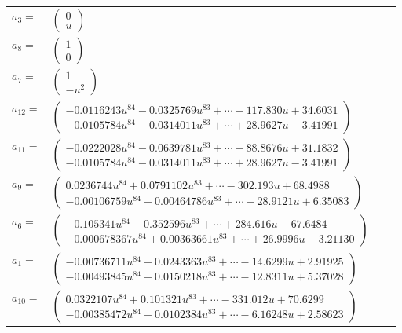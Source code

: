 \documentclass[1p]{elsarticle_modified}
\theoremstyle{definition}
\begin{document}
\begin{tabular}{m{7pt} m{180pt} m{7pt} m{180pt} }
\flushright $a_{3}=$&$\begin{pmatrix}0\\u\end{pmatrix}$ \\
\flushright $a_{8}=$&$\begin{pmatrix}1\\0\end{pmatrix}$ \\
\flushright $a_{7}=$&$\begin{pmatrix}1\\- u^2\end{pmatrix}$ \\
\flushright $a_{12}=$&$\begin{pmatrix}-0.0116243 u^{84}-0.0325769 u^{83}+\cdots-117.830 u+34.6031\\-0.0105784 u^{84}-0.0314011 u^{83}+\cdots+28.9627 u-3.41991\end{pmatrix}$ \\
\flushright $a_{11}=$&$\begin{pmatrix}-0.0222028 u^{84}-0.0639781 u^{83}+\cdots-88.8676 u+31.1832\\-0.0105784 u^{84}-0.0314011 u^{83}+\cdots+28.9627 u-3.41991\end{pmatrix}$ \\
\flushright $a_{9}=$&$\begin{pmatrix}0.0236744 u^{84}+0.0791102 u^{83}+\cdots-302.193 u+68.4988\\-0.00106759 u^{84}-0.00464786 u^{83}+\cdots-28.9121 u+6.35083\end{pmatrix}$ \\
\flushright $a_{6}=$&$\begin{pmatrix}-0.105341 u^{84}-0.352596 u^{83}+\cdots+284.616 u-67.6484\\-0.000678367 u^{84}+0.00363661 u^{83}+\cdots+26.9996 u-3.21130\end{pmatrix}$ \\
\flushright $a_{1}=$&$\begin{pmatrix}-0.00736711 u^{84}-0.0243363 u^{83}+\cdots-14.6299 u+2.91925\\-0.00493845 u^{84}-0.0150218 u^{83}+\cdots-12.8311 u+5.37028\end{pmatrix}$ \\
\flushright $a_{10}=$&$\begin{pmatrix}0.0322107 u^{84}+0.101321 u^{83}+\cdots-331.012 u+70.6299\\-0.00385472 u^{84}-0.0102384 u^{83}+\cdots-6.16248 u+2.58623\end{pmatrix}$ \\

\end{tabular}
\end{document}
